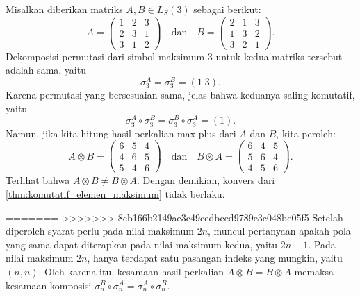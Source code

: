 \begin{contoh}\label{contoh:konvers_elemen_maksimum_tidak_berlaku}
  Misalkan diberikan matriks $A, B \in L_S(3)$ sebagai berikut:
  \[
    A=
    \begin{pmatrix}
      1 & 2 & 3 \\
      2 & 3 & 1 \\
      3 & 1 & 2
    \end{pmatrix}
    \quad \text{dan} \quad
    B=
    \begin{pmatrix}
      2 & 1 & 3 \\
      1 & 3 & 2 \\
      3 & 2 & 1
    \end{pmatrix}.
  \]
  Dekomposisi permutasi dari simbol maksimum $3$ untuk kedua matriks tersebut adalah sama, yaitu
  \[
    \sigma_3^A = \sigma_3^B = (1\;3).
  \]
  Karena permutasi yang bersesuaian sama, jelas bahwa keduanya saling komutatif, yaitu
  \[
    \sigma_3^A \circ \sigma_3^B = \sigma_3^B \circ \sigma_3^A = (1).
  \]
  Namun, jika kita hitung hasil perkalian max-plus dari $A$ dan $B$, kita peroleh:
  \[
    A \otimes B =
    \begin{pmatrix}
      6 & 5 & 4 \\
      4 & 6 & 5 \\
      5 & 4 & 6
    \end{pmatrix}
    \quad \text{dan} \quad
    B \otimes A =
    \begin{pmatrix}
      6 & 4 & 5 \\
      5 & 6 & 4 \\
      4 & 5 & 6
    \end{pmatrix}.
  \]
  Terlihat bahwa $A \otimes B \neq B \otimes A$. Dengan demikian, konvers dari \autoref{thm:komutatif_elemen_maksimum} tidak berlaku.
\end{contoh}

=======
>>>>>>> 8cb166b2149ae3c49cedbced9789e3c048be05f5
Setelah diperoleh syarat perlu pada nilai maksimum $2n$, muncul pertanyaan
apakah pola yang sama dapat diterapkan pada nilai maksimum kedua, yaitu
$2n-1$. Pada nilai maksimum $2n$, hanya terdapat satu pasangan indeks yang
mungkin, yaitu $(n,n)$. Oleh karena itu, kesamaan hasil perkalian
$A\otimes B=B\otimes A$ memaksa kesamaan komposisi
$\sigma_n^B\circ\sigma_n^A=\sigma_n^A\circ\sigma_n^B$.

